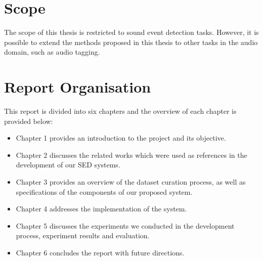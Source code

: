 
\section{Scope}
The scope of this thesis is restricted to sound event detection tasks. However, it is possible to extend the methods proposed in this thesis to other tasks in the audio domain, such as audio tagging.

\section{Report Organisation}
This report is divided into six chapters and the overview of each chapter is provided below:
\begin{itemize}

\item{Chapter 1 provides an introduction to the project and its objective.}
\item{Chapter 2 discusses the related works which were used as references in the development of our SED systems.}
\item{Chapter 3 provides an overview of the dataset curation process,  as well as specifications of the components of our proposed system.} 
\item{Chapter 4 addresses the implementation of the system.}
\item{Chapter 5 discusses the experiments we conducted in the development process, experiment results and evaluation.}
\item{Chapter 6 concludes the report with future directions.}

\end{itemize}
\newpage



